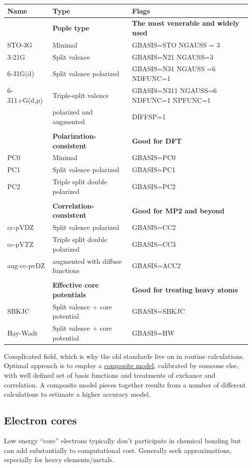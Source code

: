 \documentclass[11pt]{article}
\begin{document}
\begin{center}
\begin{tabular}{lll}
\hline
Name & Type & Flags\\
\hline
 & \textbf{Pople type} & \textbf{The most venerable and widely used}\\
STO-3G & Minimal & GBASIS=STO  NGAUSS = 3\\
3-21G & Split valence & GBASIS=N21  NGAUSS=3\\
6-31G(d) & Split valence polarized & GBASIS=N31 NGAUSS =6 NDFUNC=1\\
6-311+G(d,p) & Triple-split valence & GBASIS=N311 NGAUSS=6 NDFUNC=1 NPFUNC=1\\
 & polarized and augmented & DIFFSP=1\\
 &  & \\
 & \textbf{Polarization-consistent} & \textbf{Good for DFT}\\
PC0 & Minimal & GBASIS=PC0\\
PC1 & Split valence polarized & GBASIS=PC1\\
PC2 & Triple split double polarized & GBASIS=PC2\\
 &  & \\
 & \textbf{Correlation-consistent} & \textbf{Good for MP2 and beyond}\\
cc-pVDZ & Split valence polarized & GBASIS=CC2\\
cc-pVTZ & Triple split double polarized & GBASIS=CC3\\
aug-cc-pvDZ & augmented with diffuse functions & GBASIS=ACC2\\
 &  & \\
 & \textbf{Effective core potentials} & \textbf{Good for treating heavy atoms}\\
SBKJC & Split valence + core potential & GBASIS=SBKJC\\
Hay-Wadt & Split valence + core potential & GBASIS=HW\\
\hline
\end{tabular}
\end{center}

Complicated field, which is why the old standards live on in routine calculations.  Optimal approach is to employ a \uline{composite model}, calibrated by someone else, with well defined set of basis functions and treatments of exchance and correlation.  A composite model pieces together results from a number of different calculations to estimate a higher accuracy model.

\subsection{Electron cores}
\label{sec:orga9814d0}
Low energy ``core'' electrons typically don't participate in chemical bonding but can add substantially  to computational cost.  Generally seek approximations, especially  for heavy elements/metals.
\end{document}
